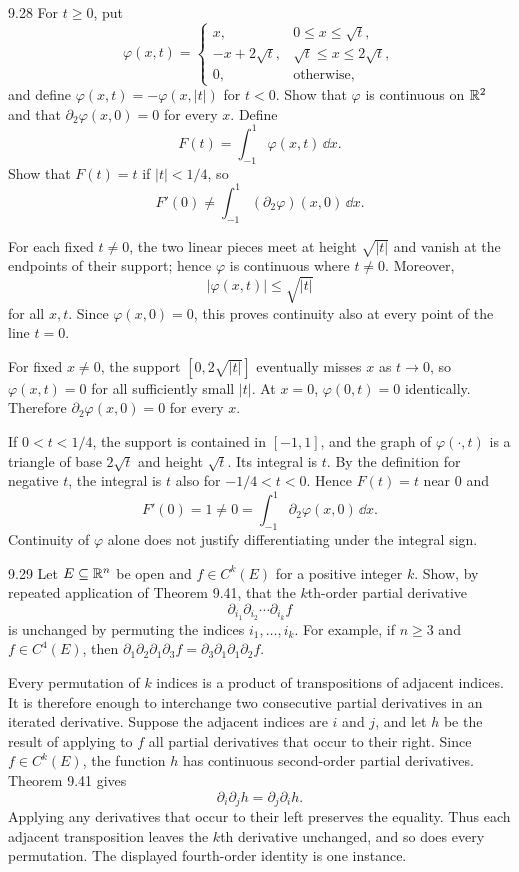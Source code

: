 \documentclass[11pt,oneside]{article}
\begin{document}
\begin{exercise}{9.28}
For $t\ge0$, put
\[
 \varphi(x,t)=
 \begin{cases}
 x,&0\le x\le\sqrt t,\\
 -x+2\sqrt t,&\sqrt t\le x\le2\sqrt t,\\
 0,&\text{otherwise},
 \end{cases}
\]
and define $\varphi(x,t)=-\varphi(x,|t|)$ for $t<0$. Show that $\varphi$ is continuous on $\mathbb{R}^2$ and that $\partial_2\varphi(x,0)=0$ for every $x$. Define
\[
 F(t)=\int_{-1}^1\varphi(x,t)\,\dd x.
\]
Show that $F(t)=t$ if $|t|<1/4$, so
\[
 F'(0)\ne\int_{-1}^1(\partial_2\varphi)(x,0)\,\dd x.
\]
\end{exercise}
\begin{solution}
For each fixed $t\ne0$, the two linear pieces meet at height $\sqrt{|t|}$ and vanish at the endpoints of their support; hence $\varphi$ is continuous where $t\ne0$. Moreover,
\[
 |\varphi(x,t)|\le\sqrt{|t|}
\]
for all $x,t$. Since $\varphi(x,0)=0$, this proves continuity also at every point of the line $t=0$.

For fixed $x\ne0$, the support $[0,2\sqrt{|t|}]$ eventually misses $x$ as $t\to0$, so $\varphi(x,t)=0$ for all sufficiently small $|t|$. At $x=0$, $\varphi(0,t)=0$ identically. Therefore $\partial_2\varphi(x,0)=0$ for every $x$.

If $0<t<1/4$, the support is contained in $[-1,1]$, and the graph of $\varphi(\cdot,t)$ is a triangle of base $2\sqrt t$ and height $\sqrt t$. Its integral is $t$. By the definition for negative $t$, the integral is $t$ also for $-1/4<t<0$. Hence $F(t)=t$ near $0$ and
\[
 \boxed{F'(0)=1\ne0=\int_{-1}^1\partial_2\varphi(x,0)\,\dd x.}
\]
Continuity of $\varphi$ alone does not justify differentiating under the integral sign.
\end{solution}

\begin{exercise}{9.29}
Let $E\subseteq\mathbb{R}^n$ be open and $f\in C^k(E)$ for a positive integer $k$. Show, by repeated application of Theorem 9.41, that the $k$th-order partial derivative
\[
 \partial_{i_1}\partial_{i_2}\cdots\partial_{i_k}f
\]
is unchanged by permuting the indices $i_1,\ldots,i_k$. For example, if $n\ge3$ and $f\in C^4(E)$, then $\partial_1\partial_2\partial_1\partial_3 f=\partial_3\partial_1\partial_1\partial_2 f$.
\end{exercise}
\begin{solution}
Every permutation of $k$ indices is a product of transpositions of adjacent indices. It is therefore enough to interchange two consecutive partial derivatives in an iterated derivative. Suppose the adjacent indices are $i$ and $j$, and let $h$ be the result of applying to $f$ all partial derivatives that occur to their right. Since $f\in C^k(E)$, the function $h$ has continuous second-order partial derivatives. Theorem 9.41 gives
\[
 \partial_i\partial_jh=\partial_j\partial_ih.
\]
Applying any derivatives that occur to their left preserves the equality. Thus each adjacent transposition leaves the $k$th derivative unchanged, and so does every permutation. The displayed fourth-order identity is one instance.
\end{solution}
\end{document}
